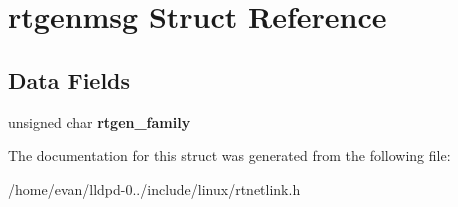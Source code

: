 \section{rtgenmsg \-Struct \-Reference}
\label{structrtgenmsg}
\subsection*{\-Data \-Fields}
\begin{DoxyCompactItemize}
\item 
unsigned char {\bfseries rtgen\-\_\-family}\label{structrtgenmsg_ad82cf6561d57d8750c67822096c6b6ae}

\end{DoxyCompactItemize}


\-The documentation for this struct was generated from the following file\-:\begin{DoxyCompactItemize}
\item 
/home/evan/lldpd-\/0../include/linux/rtnetlink.\-h\end{DoxyCompactItemize}
